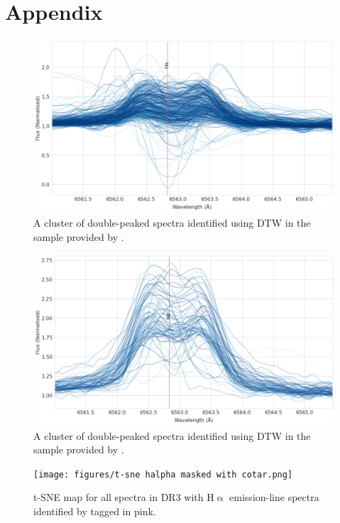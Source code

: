 \chapter{Appendix}

\begin{figure}[!htb]
\centering
\includegraphics[scale=0.42]{figures/cotar_class_4_10.png}
\caption{A cluster of double-peaked spectra identified using DTW in the sample provided by \citet{vcotar2021galah}.}
\end{figure}

\begin{figure}[!htb]
\centering
\includegraphics[scale=0.42]{figures/cotar_class_6_10.png}
\caption{A cluster of double-peaked spectra identified using DTW in the sample provided by \citet{vcotar2021galah}.}
\end{figure}

\begin{figure}[!htb]
\centering
\texttt{[image: figures/t-sne halpha masked with cotar.png]}
\caption{t-SNE map for all spectra in DR3 with H$\upalpha$ emission-line spectra identified by \citet{vcotar2021galah} tagged in pink.}
\end{figure}

